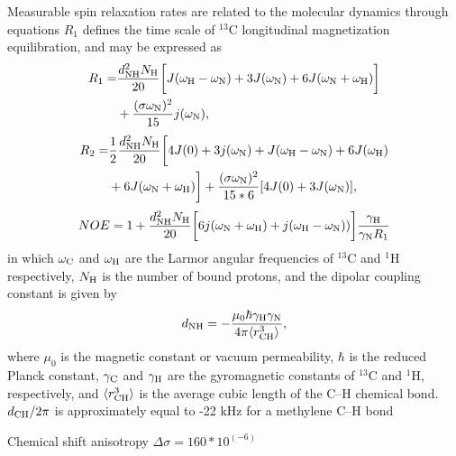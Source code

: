 \documentclass[pre,aps,floatfix,authordate1-4,twocolumn]{revtex4-1}
\begin{document}
Measurable spin relaxation rates are related to the molecular dynamics through
equations
$R_1$ defines the time scale of $^{13}$C longitudinal magnetization equilibration, and may be expressed as
\begin{equation}\label{R1}
  \begin{aligned}
  R_{1}= & \frac{d_{\rm{NH}}^2N_{\rm{H}}}{20}\bigg[J(\omega_{\rm{H}}-\omega_{\rm{N}})+3J(\omega_{\rm{N}})+6J(\omega_{\rm{N}}+\omega_{\rm{H}})\bigg] \\
        & +\frac{(\sigma \omega_{\rm{N}})^2}{15}j(\omega_{\rm{N}}),
  \end{aligned}
\end{equation}
\begin{equation}\label{R2}
    \begin{aligned}
  R_{2}= & \frac{1}{2}\frac{d_{\rm{NH}}^2N_{\rm{H}}}{20}\bigg[4J(0)+3j(\omega_{\rm{N}})+J(\omega_{\rm{H}}-\omega_{\rm{N}})+6J(\omega_{\rm{H}})  \\
    & +6J(\omega_{\rm{N}}+\omega_{\rm{H}})\bigg]+\frac{(\sigma \omega_{\rm{N}})^2}{15*6}[4J(0) +3J(\omega_{\rm{N}})],
    \end{aligned}
\end{equation}
\begin{equation}\label{NOE}
NOE=1+\frac{d_{\rm{NH}}^2N_{\rm{H}}}{20}\bigg[6j(\omega_{\rm{N}}+\omega_{\rm{H}})+j(\omega_{\rm{H}}-\omega_{\rm{N}}))\bigg]\frac{\gamma_{\rm{H}}}{\gamma_{\rm{N}}R_1}
\end{equation}
in which $\omega_{\rm{C}}$ and $\omega_{\rm{H}}$ are the Larmor angular frequencies of $^{13}$C and $^1$H respectively, $N_{\rm{H}}$ is the number of bound protons, and the dipolar coupling constant is given by
\begin{equation}
d_{\rm{NH}}=-\frac{\mu_0\hbar\gamma_{\rm{H}}\gamma_{\rm{N}}}{4\pi\langle r_{\rm{CH}}^3\rangle},\nonumber
\end{equation}
where $\mu_0$ is the magnetic constant or vacuum permeability, $\hbar$ is the reduced Planck constant, $\gamma_{\rm{C}}$ and $\gamma_{\rm{H}}$ are the gyromagnetic constants of $^{13}$C and $^1$H, respectively, and $\langle r_{\rm{CH}}^3\rangle$ is the average cubic length of the C--H chemical bond. $d_{\rm{CH}}/2\pi$ is approximately equal to -22 kHz for a methylene C--H bond

Chemical shift anisotropy $\Delta \sigma=160*10^(-6)$
\end{document}
